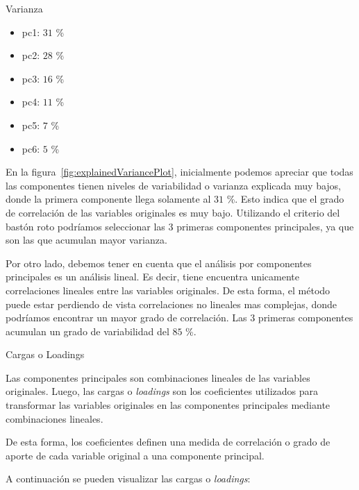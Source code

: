 \documentclass[11pt,a4paper,twoside]{thesis}
\begin{document}
\begin{description}
	\item[Varianza]
\end{description}
\begin{itemize}
	\item pc1: $31$ \%
	\item pc2: $28$ \%
	\item pc3: $16$ \%
	\item pc4: $11$ \%
	\item pc5: $7$ \%
	\item pc6: $5$ \%
\end{itemize}

En la figura~\ref{fig:explainedVariancePlot}, inicialmente podemos apreciar que
todas las componentes tienen niveles de variabilidad o varianza explicada muy
bajos, donde la primera componente llega solamente al $31$ \%. Esto indica que
el grado de correlación de las variables originales es muy bajo. Utilizando el
criterio del bastón roto podríamos seleccionar las 3 primeras componentes
principales, ya que son las que acumulan mayor varianza.

Por otro lado, debemos tener en cuenta que el análisis por componentes
principales es un análisis lineal. Es decir, tiene encuentra unicamente
correlaciones lineales entre las variables originales. De esta forma, el método
puede estar perdiendo de vista correlaciones no lineales mas complejas, donde
podríamos encontrar un mayor grado de correlación. Las 3 primeras componentes
acumulan un grado de variabilidad del $85$ \%.

\begin{description}
	\item[Cargas o Loadings]
\end{description}

Las componentes principales son combinaciones lineales de las variables
originales. Luego, las cargas o \textit{loadings} son los coeficientes
utilizados para transformar las variables originales en las componentes
principales mediante combinaciones lineales.

De esta forma, los coeficientes definen una medida de correlación o grado de
aporte de cada variable original a una componente principal.

A continuación se pueden visualizar las cargas o \textit{loadings}:
\end{document}
